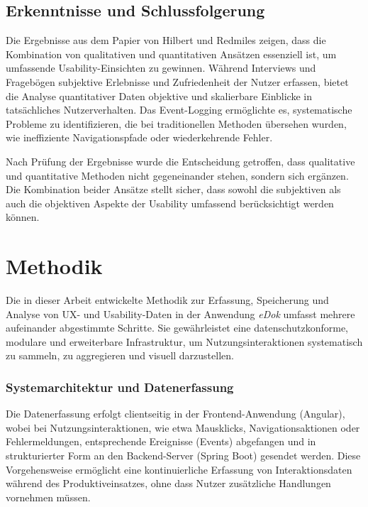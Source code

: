 \documentclass[12pt,oneside]{article}
\begin{document}
\subsection{Erkenntnisse und Schlussfolgerung}
Die Ergebnisse aus dem Papier von Hilbert und Redmiles \cite{Hilbert2000} zeigen, dass die Kombination von qualitativen und quantitativen Ansätzen essenziell ist, um umfassende Usability-Einsichten zu gewinnen. Während Interviews und Fragebögen subjektive Erlebnisse und Zufriedenheit der Nutzer erfassen, bietet die Analyse quantitativer Daten objektive und skalierbare Einblicke in tatsächliches Nutzerverhalten. Das Event-Logging ermöglichte es, systematische Probleme zu identifizieren, die bei traditionellen Methoden übersehen wurden, wie ineffiziente Navigationspfade oder wiederkehrende Fehler.

Nach Prüfung der Ergebnisse wurde die Entscheidung getroffen, dass qualitative und quantitative Methoden nicht gegeneinander stehen, sondern sich ergänzen. Die Kombination beider Ansätze stellt sicher, dass sowohl die subjektiven als auch die objektiven Aspekte der Usability umfassend berücksichtigt werden können.

\section{Methodik} \label{sec:methodik}

Die in dieser Arbeit entwickelte Methodik zur Erfassung, Speicherung und Analyse von UX- und Usability-Daten in der Anwendung \textit{eDok} umfasst mehrere aufeinander abgestimmte Schritte. Sie gewährleistet eine datenschutzkonforme, modulare und erweiterbare Infrastruktur, um Nutzungsinteraktionen systematisch zu sammeln, zu aggregieren und visuell darzustellen.

\subsubsection{Systemarchitektur und Datenerfassung}

Die Datenerfassung erfolgt clientseitig in der Frontend-Anwendung (Angular), wobei bei Nutzungsinteraktionen, wie etwa Mausklicks, Navigationsaktionen oder Fehlermeldungen, entsprechende Ereignisse (Events) abgefangen und in strukturierter Form an den Backend-Server (Spring Boot) gesendet werden. Diese Vorgehensweise ermöglicht eine kontinuierliche Erfassung von Interaktionsdaten während des Produktiveinsatzes, ohne dass Nutzer zusätzliche Handlungen vornehmen müssen.
\end{document}

